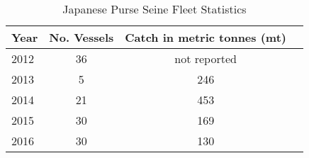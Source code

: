 \begin{table}[htbp] \centering 
	\caption{Japanese Purse Seine Fleet Statistics} 
	\label{tab:palau_purse} 

\begin{tabular}{l*{3}c}

\hline
\hline
Year	&	No. Vessels	&	Catch in metric tonnes (mt)	\\
\hline	
2012	&	36	&	not reported	\\		
2013	&	5	&	246	\\	
2014	&	21	&	453	\\
2015	&	30	&	169	\\	
2016	&	30	&	130	\\





\hline 
\hline

\end{tabular} 




\end{table}